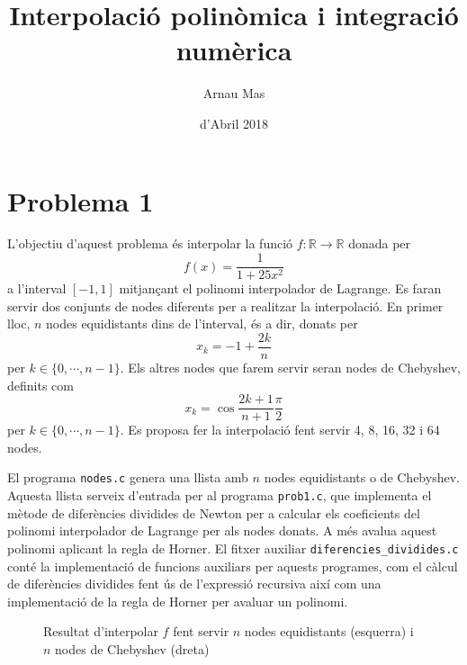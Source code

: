 \documentclass[12pt]{article}
\title{\sffamily {\bfseries Pràctica 3:} Interpolació polinòmica i integració numèrica}
\author{\sffamily Arnau Mas}
\date{\sffamily 24 d'Abril 2018}
\numberwithin{table}{section}
\numberwithin{figure}{section}
\numberwithin{equation}{section}
\newcommand{\R}{\mathbb{R}}
\begin{document}
\maketitle

\section{Problema 1}
L'objectiu d'aquest problema és interpolar la funció \( f \colon \R \to \R \) donada per
\begin{equation*}
	f(x) = \frac{1}{1 + 25x^2}
\end{equation*}
a l'interval \( [-1,1] \) mitjançant el polinomi interpolador de Lagrange. Es faran servir dos conjunts de nodes diferents per a realitzar la interpolació. En primer lloc, \( n \) nodes equidistants dins de l'interval, és a dir, donats per
\begin{equation*}
	x_k = -1 + \frac{2k}{n}
\end{equation*}
per \( k \in \{0, \cdots, n-1\} \). Els altres nodes que farem servir seran nodes de Chebyshev, definits com
\begin{equation*}
	x_k = \cos{\frac{2k+1}{n+1} \frac{\pi}{2}}
\end{equation*}
per \( k \in \{0, \cdots, n-1\} \). Es proposa fer la interpolació fent servir 4, 8, 16, 32 i 64 nodes. 

El programa \texttt{nodes.c} genera una llista amb \( n \) nodes equidistants o de Chebyshev. Aquesta llista serveix d'entrada per al programa \texttt{prob1.c}, que implementa el mètode de diferències dividides de Newton per a calcular els coeficients del polinomi interpolador de Lagrange per als nodes donats. A més avalua aquest polinomi aplicant la regla de Horner. El fitxer auxiliar \texttt{diferencies\_dividides.c} conté la implementació de funcions auxiliars per aquests programes, com el càlcul de diferències dividides fent ús de l'expressió recursiva així com una implementació de la regla de Horner per avaluar un polinomi. 

\begin{figure}[htb]
	\centering
	\sffamily \footnotesize
	
	
	
	
	\caption{Resultat d'interpolar \( f \) fent servir \( n \) nodes equidistants (esquerra) i \( n \) nodes de Chebyshev (dreta)}
	\label{fig:interpolacio}
\end{figure}
\end{document}
